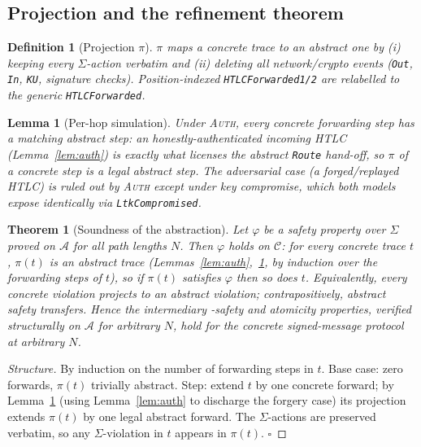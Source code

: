 \documentclass[11pt]{article}
\newtheorem{theorem}{Theorem}
\newtheorem{lemma}{Lemma}
\newtheorem{definition}{Definition}
\begin{document}
\subsection*{Projection and the refinement theorem}

\begin{definition}[Projection $\pi$]
$\pi$ maps a concrete trace to an abstract one by (i) keeping every
$\Sigma$-action verbatim and (ii) deleting all network/crypto events
(\texttt{Out}, \texttt{In}, \texttt{KU}, signature checks). Position-indexed
\texttt{HTLCForwarded1/2} are relabelled to the generic \texttt{HTLCForwarded}.
\end{definition}

\begin{lemma}[Per-hop simulation]
\label{lem:sim}
Under \textsc{Auth}, every concrete forwarding step has a matching abstract
step: an honestly-authenticated incoming HTLC (Lemma~\ref{lem:auth}) is exactly
what licenses the abstract \texttt{Route} hand-off, so $\pi$ of a concrete step
is a legal abstract step. The adversarial case (a forged/replayed HTLC) is ruled
out by \textsc{Auth} except under key compromise, which both models expose
identically via \texttt{LtkCompromised}.
\end{lemma}

\begin{theorem}[Soundness of the abstraction]
\label{thm:main}
Let $\varphi$ be a safety property over $\Sigma$ proved on $\mathcal{A}$ for all
path lengths $N$. Then $\varphi$ holds on $\mathcal{C}$: for every concrete trace
$t$, $\pi(t)$ is an abstract trace (Lemmas~\ref{lem:auth},~\ref{lem:sim}, by
induction over the forwarding steps of $t$), so if $\pi(t)$ satisfies $\varphi$
then so does $t$. Equivalently, every concrete violation projects to an abstract
violation; contrapositively, abstract safety transfers. Hence the intermediary%
-safety and atomicity properties, verified structurally on $\mathcal{A}$ for
arbitrary $N$, hold for the concrete signed-message protocol at arbitrary $N$.
\end{theorem}

\begin{proof}[Structure]
By induction on the number of forwarding steps in $t$. Base case: zero forwards,
$\pi(t)$ trivially abstract. Step: extend $t$ by one concrete forward; by
Lemma~\ref{lem:sim} (using Lemma~\ref{lem:auth} to discharge the forgery case)
its projection extends $\pi(t)$ by one legal abstract forward. The
$\Sigma$-actions are preserved verbatim, so any $\Sigma$-violation in $t$ appears
in $\pi(t)$. $\square$
\end{proof}
\end{document}
